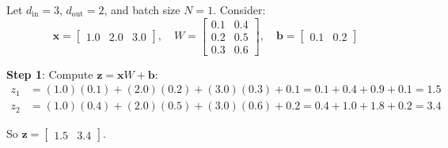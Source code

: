 \documentclass[12pt, a4paper]{report}
\theoremstyle{definition}
\begin{document}
\begin{numexample}
Let $d_\text{in} = 3$, $d_\text{out} = 2$, and batch size $N = 1$. Consider:
\[
\mathbf{x} = \begin{bmatrix} 1.0 & 2.0 & 3.0 \end{bmatrix}, \quad
W = \begin{bmatrix} 0.1 & 0.4 \\ 0.2 & 0.5 \\ 0.3 & 0.6 \end{bmatrix}, \quad
\mathbf{b} = \begin{bmatrix} 0.1 & 0.2 \end{bmatrix}
\]

\textbf{Step 1}: Compute $\mathbf{z} = \mathbf{x} W + \mathbf{b}$:
\begin{align*}
z_1 &= (1.0)(0.1) + (2.0)(0.2) + (3.0)(0.3) + 0.1 = 0.1 + 0.4 + 0.9 + 0.1 = \boxed{1.5} \\
z_2 &= (1.0)(0.4) + (2.0)(0.5) + (3.0)(0.6) + 0.2 = 0.4 + 1.0 + 1.8 + 0.2 = \boxed{3.4}
\end{align*}

So $\mathbf{z} = \begin{bmatrix} 1.5 & 3.4 \end{bmatrix}$.
\end{numexample}
\end{document}
